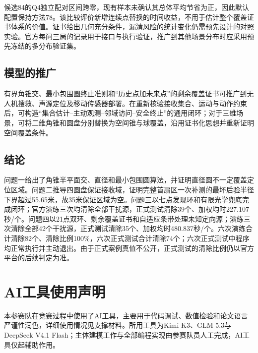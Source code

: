 \documentclass[UTF8,a4paper,zihao=-4,fontset=fandol]{ctexart}
\begin{document}
候选84的Q4独立配对区间跨零，现有样本未确认其总体平均节省为正，因此默认配置保持方法78。该比较评价新增连续点替换的时间收益，不用于估计整个覆盖证书体系的价值。证书给出几何充分条件，漏清风险的统计变化仍需预先设计的对照实验。官方每问三局的记录用于接口与执行验证，推广到其他场景分布时应采用预先冻结的多分布验证集。

\subsection{模型的推广}
有界角锥交、最小包围圆终止准则和“历史点加未来点”的剩余覆盖证书可推广到无人机搜救、声源定位及移动传感器部署。在重新核验接收集合、运动与动作约束后，可构造“集合估计--主动观测--邻域访问--安全终止”的通用闭环；对于三维场景，可将二维角锥和圆盘分别替换为空间锥与球覆盖，沿用证书化思想并重新证明空间覆盖条件。

\subsection{结论}
问题一给出了角锥半平面交、直径和最小包围圆算法，并证明直径圆不一定覆盖定位区域。问题二推导四圆盘保证接收域，证明完整首扇区一次补测的最坏后验半径下界超过55.65米，故35米保证区域为空。问题三以七点发现环和有限光学兜底完成闭环；官方演练三次均清除全部干扰源，正式测试清除39个、加权均时227.107秒/个。问题四以21点双环、剩余覆盖证书和自适应条带处理未知定向源；演练三次清除全部42个干扰源，正式测试清除35个、加权均时480.837秒/个。六次演练合计清除82个、清除比例100\%，六次正式测试合计清除74个；六次正式测试中程序均正常执行并主动退出。由于正式案例真值不公开，正式测试的清除比例仍以官方平台的后续判定为准。

\noindent\begin{minipage}{\linewidth}
\section*{AI工具使用声明}
本参赛队在竞赛过程中使用了AI工具，主要用于代码调试、数值检验和论文语言严谨性润色，详细使用情况见支撑材料。所用工具为Kimi K3、GLM 5.3与DeepSeek V4.1 Flash；主体建模工作与全部编程实现由参赛队员人工完成，AI工具仅起辅助作用。

\end{minipage}
\end{document}
